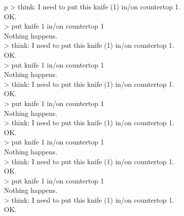 \begin{table}[H]
\begin{minipage}{0.9\linewidth}
\begin{tabular}{p\linewidth}
> think: I need to put this knife (1) in/on countertop 1. \\
OK. \\
> put knife 1 in/on countertop 1 \\
Nothing happens. \\
> think: I need to put this knife (1) in/on countertop 1. \\
OK. \\
> put knife 1 in/on countertop 1 \\
Nothing happens. \\
> think: I need to put this knife (1) in/on countertop 1. \\
OK. \\
> put knife 1 in/on countertop 1 \\
Nothing happens. \\
> think: I need to put this knife (1) in/on countertop 1. \\
OK. \\
> put knife 1 in/on countertop 1 \\
Nothing happens. \\
> think: I need to put this knife (1) in/on countertop 1. \\
OK. \\
> put knife 1 in/on countertop 1 \\
Nothing happens. \\
> think: I need to put this knife (1) in/on countertop 1. \\
OK. \\

\end{tabular}
\end{minipage}
\end{table}
